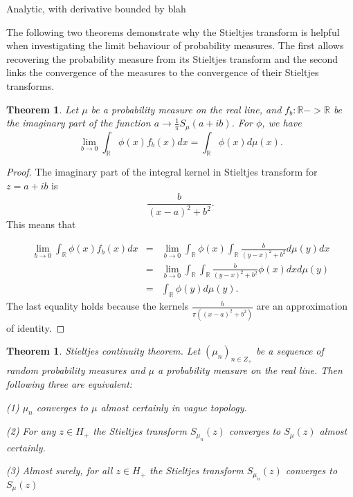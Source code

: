 \documentclass[12pt,a4paper,leqno]{report}
\newcommand{\R}{\mathbb{R}}
\theoremstyle{plain}
\newtheorem{theo}[equation]{Theorem}
\theoremstyle{definition}
\theoremstyle{remark}
\begin{document}
Analytic, with derivative bounded by blah

The following two theorems demonstrate why the Stieltjes transform is helpful when investigating the limit behaviour of probability measures. The first allows recovering the probability measure from its Stieltjes transform and the second links the convergence of the measures to the convergence of their Stieltjes transforms.

\begin{theo}
Let $\mu$ be a probability measure on the real line, and $f_b : \R -> \R$ be the imaginary part of the function $a  \to \frac{1}{\pi} S_{\mu}(a+ib)$.  For $\phi$, we have
\begin{equation*}
\lim_{b \to 0} \int_{\R} \phi(x) f_b (x) dx = \int_{\R} \phi(x) d\mu(x).
\end{equation*}
\end{theo}

\begin{proof}
The imaginary part of the integral kernel in Stieltjes transform for $z=a+ib$ is
\begin{equation*}
\frac{b}{(x-a)^2+b^2}.
\end{equation*}
This means that

\begin{eqnarray*}
\lim_{b \to 0} \int_{\R} \phi(x) f_b (x) dx & = & \lim_{b \to 0} \int_{\R} \phi(x) \int_{\R} \frac{b}{(y-x)^2+b^2} d\mu(y) dx\\
& = & \lim_{b \to 0} \int_{\R} \int_{\R} \frac{b}{(y-x)^2+b^2} \phi(x) dx d\mu(y)\\
& = & \int_{\R} \phi(y) d\mu(y).
\end{eqnarray*}
The last equality holds because the kernels $\frac{b}{\pi((x-a)^2+b^2)}$ are an approximation of identity.
\end{proof}

\begin{theo}
\emph{Stieltjes continuity theorem}. Let $(\mu_n)_{n \in Z_+}$ be a 
sequence of random probability measures and $\mu$ a probability measure on the real line. Then following three are equivalent:

(1) $\mu_n$ converges to $\mu$ almost certainly in vague topology.

(2) For any $z \in H_+$ the Stieltjes transform $S_{\mu_n}(z)$ converges to $S_{\mu}(z)$ almost certainly.

(3) Almost surely, for all $z \in H_+$ the Stieltjes transform $S_{\mu_n}(z)$ converges to $S_{\mu}(z)$
\end{theo}
\end{document}
